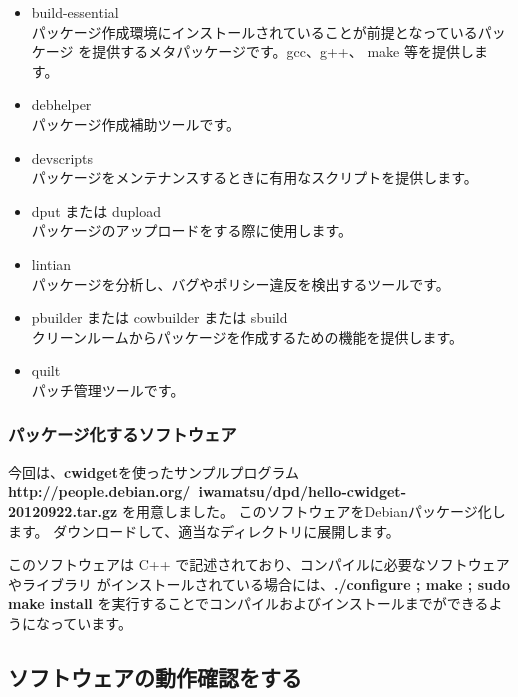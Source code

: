 \documentclass[mingoth,a4paper]{jsarticle}
\begin{document}
\begin{itemize}
\item build-essential\\
パッケージ作成環境にインストールされていることが前提となっているパッケージ
を提供するメタパッケージです。gcc、g++、 make 等を提供します。
 
\item debhelper\\
パッケージ作成補助ツールです。
\item devscripts\\
パッケージをメンテナンスするときに有用なスクリプトを提供します。
\item dput または dupload\\
パッケージのアップロードをする際に使用します。
\item lintian\\
パッケージを分析し、バグやポリシー違反を検出するツールです。
\item pbuilder または cowbuilder または sbuild\\
クリーンルームからパッケージを作成するための機能を提供します。
\item quilt\\
パッチ管理ツールです。
\end{itemize}

\subsubsection{パッケージ化するソフトウェア}
今回は、{\bf cwidget}を使ったサンプルプログラム
{\bf http://people.debian.org/~iwamatsu/dpd/hello-cwidget-20120922.tar.gz}
を用意しました。
このソフトウェアをDebianパッケージ化します。
ダウンロードして、適当なディレクトリに展開します。

このソフトウェアは C++ で記述されており、コンパイルに必要なソフトウェアやライブラリ
がインストールされている場合には、{\bf ./configure ; make ; sudo make install} 
を実行することでコンパイルおよびインストールまでができるようになっています。

\subsection{ソフトウェアの動作確認をする}
\end{document}

